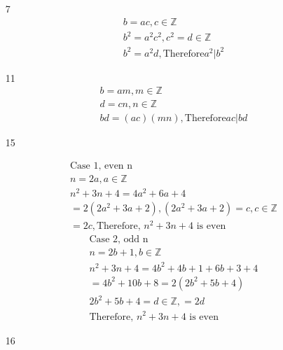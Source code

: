 \documentclass[12pt]{article}
\begin{document}
\begin{enumerate}
    \item [7]
	\begin{equation*}
	    \begin{split}
		b = ac, c \in \mathbb{Z}\\
		b^2 = a^2c^2, c^2 = d \in \mathbb{Z}\\
		b^2 = a^2d, \text{Therefore} a^2|b^2
	    \end{split}
	\end{equation*}
    \item [11] 
	\begin{equation*}
	    \begin{split}
		b = am, m \in \mathbb{Z}\\
		d = cn, n \in \mathbb{Z}\\
		bd = (ac)(mn), \text{Therefore} ac|bd
	    \end{split}
	\end{equation*}
    \item [15] 
	\begin{multicols}{2}
	    \begin{equation*}
		\begin{split}
		    \text{Case 1, even n}\\
		    n = 2a, a \in \mathbb{Z}\\
		    n^2 + 3n + 4 = 4a^2 + 6a + 4\\
		    = 2(2a^2 + 3a + 2), (2a^2 + 3a + 2) = c, c \in \mathbb{Z}\\
		    = 2c, \text{Therefore, $n^2 + 3n + 4$ is even}
		\end{split}
	    \end{equation*}
	    \begin{equation*}
		\begin{split}
		    \text{Case 2, odd n}\\
		    n = 2b + 1, b \in \mathbb{Z}\\
		    n^2 + 3n + 4 = 4b^2 + 4b + 1 + 6b + 3 + 4\\
		    = 4b^2 + 10b + 8 = 2(2b^2 + 5b + 4)\\
		    2b^2 + 5b + 4 = d \in \mathbb{Z}, = 2d\\
		    \text{Therefore, $n^2 + 3n + 4$ is even}
		\end{split}
	    \end{equation*}
	\end{multicols}
    \item [16] 
	\begin{multicols}{2}
	\begin{equation*}
	    \begin{split}

\end{split}
\end{equation*}
\end{multicols}
\end{enumerate}
\end{document}
